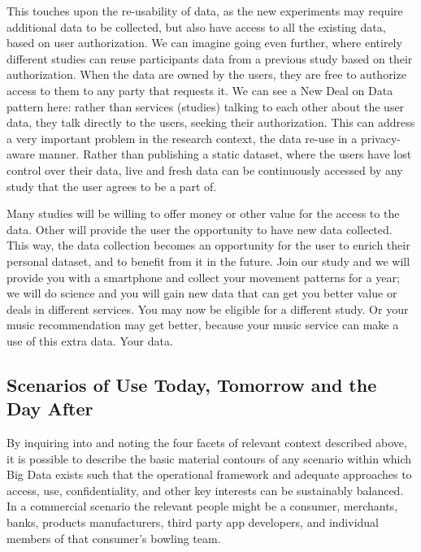 This touches upon the re-usability of data, as the new experiments may require additional data to be collected, but also have access to all the existing data, based on user authorization.
We can imagine going even further, where entirely different studies can reuse participants data from a previous study based on their authorization.
When the data are owned by the users, they are free to authorize access to them to any party that requests it. We can see a New Deal on Data pattern here: rather than services (studies) talking to each other about the user data, they talk directly to the users, seeking their authorization.
This can address a very important problem in the research context, the data re-use in a privacy-aware manner.
Rather than publishing a static dataset, where the users have lost control over their data, live and fresh data can be continuously accessed by any study that the user agrees to be a part of.

Many studies will be willing to offer money or other value for the access to the data.
Other will provide the user the opportunity to have new data collected.
This way, the data collection becomes an opportunity for the user to enrich their personal dataset, and to benefit from it in the future.
Join our study and we will provide you with a smartphone and collect your movement patterns for a year; we will do science and you will gain new data that can get you better value or deals in different services.
You may now be eligible for a different study.
Or your music recommendation may get better, because your music service can make a use of this extra data.
Your data.

 \subsection{Scenarios of Use Today, Tomorrow and the Day After}



By inquiring into and noting the four facets of relevant context described above, it is possible to describe the basic material contours of any scenario within which Big Data exists such that the operational framework and adequate approaches to access, use, confidentiality, and other key interests can be sustainably balanced.
In a commercial scenario the relevant people might be a consumer, merchants, banks, products manufacturers, third party app developers, and individual members of that consumer’s bowling team.

